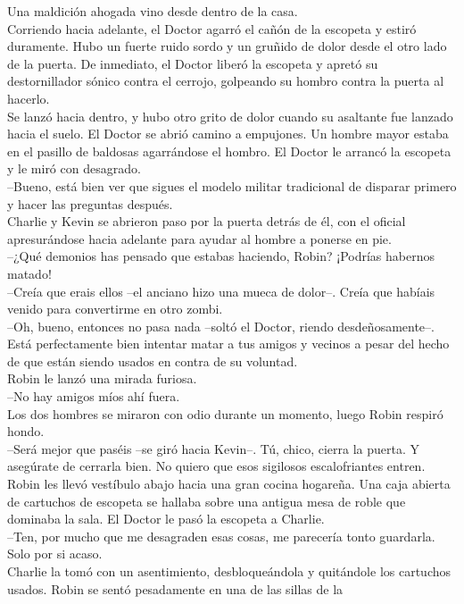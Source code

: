 Una maldición ahogada vino desde dentro de la casa.\\
Corriendo hacia adelante, el Doctor agarró el cañón de la escopeta y
estiró duramente. Hubo un fuerte ruido sordo y un gruñido de dolor desde
el otro lado de la puerta. De inmediato, el Doctor liberó la escopeta y
apretó su destornillador sónico contra el cerrojo, golpeando su hombro
contra la puerta al hacerlo.\\
Se lanzó hacia dentro, y hubo otro grito de dolor cuando su asaltante
fue lanzado hacia el suelo. El Doctor se abrió camino a empujones. Un
hombre mayor estaba en el pasillo de baldosas agarrándose el hombro. El
Doctor le arrancó la escopeta y le miró con desagrado.\\
--Bueno, está bien ver que sigues el modelo militar tradicional de
disparar primero y hacer las preguntas después.\\
Charlie y Kevin se abrieron paso por la puerta detrás de él, con el
oficial apresurándose hacia adelante para ayudar al hombre a ponerse en
pie.\\
--¿Qué demonios has pensado que estabas haciendo, Robin? ¡Podrías
habernos matado!\\
--Creía que erais ellos --el anciano hizo una mueca de dolor--. Creía
que habíais venido para convertirme en otro zombi.\\
--Oh, bueno, entonces no pasa nada --soltó el Doctor, riendo
desdeñosamente--. Está perfectamente bien intentar matar a tus amigos y
vecinos a pesar del hecho de que están siendo usados en contra de su
voluntad.\\
Robin le lanzó una mirada furiosa.\\
--No hay amigos míos ahí fuera.\\
Los dos hombres se miraron con odio durante un momento, luego Robin
respiró hondo.\\
--Será mejor que paséis --se giró hacia Kevin--. Tú, chico, cierra la
puerta. Y asegúrate de cerrarla bien. No quiero que esos sigilosos
escalofriantes entren.\\
Robin les llevó vestíbulo abajo hacia una gran cocina hogareña. Una caja
abierta de cartuchos de escopeta se hallaba sobre una antigua mesa de
roble que dominaba la sala. El Doctor le pasó la escopeta a Charlie.\\
--Ten, por mucho que me desagraden esas cosas, me parecería tonto
guardarla. Solo por si acaso.\\
Charlie la tomó con un asentimiento, desbloqueándola y quitándole los
cartuchos usados. Robin se sentó pesadamente en una de las sillas de la
